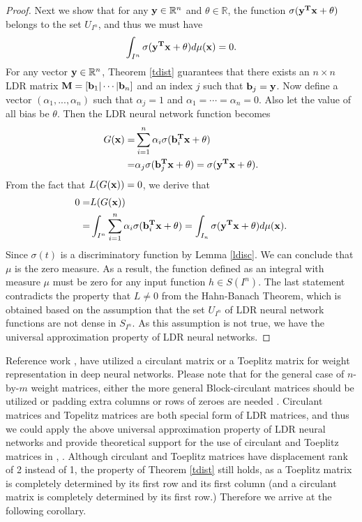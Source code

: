 \documentclass{article}
\begin{document}
\begin{proof}
Next we show that for any ${\bf y}\in\mathbb{R}^n$ and $\theta\in\mathbb{R}$, the function $\sigma({\bf y^Tx}+\theta)$ belongs to the set $U_{I^n}$, and thus we must have
\begin{equation}
\label{cdisc}
\int_{I^n}\sigma({\bf y^Tx}+\theta)d\mu({\bf x})=0.
\end{equation}
For any vector ${\bf y}\in\mathbb{R}^n$, Theorem \ref{tdist} guarantees that there exists an $n\times n$ LDR matrix ${\bf M}=[{\bf b}_1|\cdots|{\bf b}_n]$ and an index $j$ such that ${\bf b}_j={\bf y}$. Now define a vector $(\alpha_1,...,\alpha_n)$ such that $\alpha_j=1$ and $\alpha_1=\cdots=\alpha_n=0$. Also let the value of all bias be $\theta$. Then the LDR neural network function becomes
\begin{equation}
\label{egx}
\aligned
G({\bf x})
=& \sum_{i=1}^n \alpha_i\sigma({{\bf{b}}_i^{\bf{T}}\bf{x}}+\theta)\\
=& \alpha_j\sigma({{\bf{b}}_j^{\bf{T}}\bf{x}}+\theta)= \sigma({\bf y^Tx}+\theta).
\endaligned
\end{equation}
From the fact that $L(G({\bf x}))=0$, we derive that
\begin{align*}
0 =& L(G({\bf x}))\\
=& \int_{I^n}\sum_{i=1}^n \alpha_i\sigma({{\bf{b}}_i^{\bf{T}}\bf{x}}+\theta)
=\int_{I_n}\sigma({\bf y^Tx}+\theta)d\mu({\bf x}).
\end{align*}
Since $\sigma(t)$ is a discriminatory function by Lemma \ref{ldisc}. We can conclude that $\mu$ is the zero measure. As a result, the function defined as an integral with measure $\mu$ must be zero for any input function $h\in S(I^n)$. The last statement contradicts the property that $L\neq 0$ from the Hahn-Banach Theorem, which is obtained based on the assumption that the set $U_{I^n}$ of LDR neural network functions are not dense in $S_{I^n}$. As this assumption is not true, we have the universal approximation property of LDR neural networks.
\end{proof}

Reference work \cite{cheng2015exploration}, \cite{sindhwani2015structured} have utilized a circulant matrix or a Toeplitz matrix for weight representation in deep neural networks. Please note that for the general case of $n$-by-$m$ weight matrices, either the more general Block-circulant matrices should be utilized or padding extra columns or rows of zeroes are needed \cite{cheng2015exploration}. Circulant matrices and Topelitz matrices are both special form of LDR matrices, and thus we could apply the above universal approximation property of LDR neural networks and provide theoretical support for the use of circulant and Toeplitz matrices in \cite{cheng2015exploration}, \cite{sindhwani2015structured}. Although circulant and Toeplitz matrices have displacement rank of 2 instead of 1, the property of Theorem \ref{tdist} still holds, as a Toeplitz matrix is completely determined by its first row and its first column (and a circulant matrix is completely determined by its first row.) Therefore we arrive at the following corollary.
\end{document}
